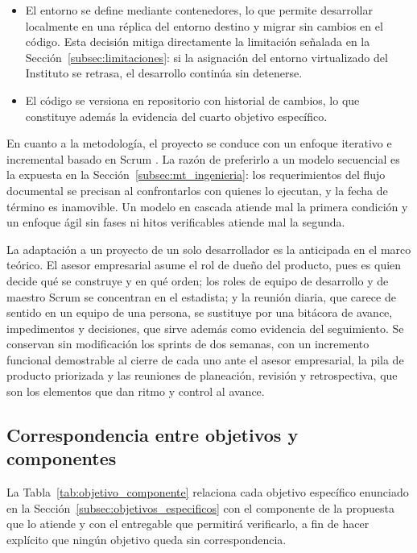 \begin{description}[leftmargin=0pt,font=\bfseries,itemsep=0.6em,parsep=0pt]
  \item[Entorno y despliegue]\leavevmode
  \begin{itemize}[nosep,leftmargin=1.4em,topsep=1pt]
    \item El entorno se define mediante contenedores, lo que permite desarrollar localmente en una réplica del entorno destino y migrar sin cambios en el código. Esta decisión mitiga directamente la limitación señalada en la Sección~\ref{subsec:limitaciones}: si la asignación del entorno virtualizado del Instituto se retrasa, el desarrollo continúa sin detenerse.
    \item El código se versiona en repositorio con historial de cambios, lo que constituye además la evidencia del cuarto objetivo específico.
  \end{itemize}
\end{description}

En cuanto a la metodología, el proyecto se conduce con un enfoque iterativo e incremental basado en Scrum \cite{scrumguide2020}. La razón de preferirlo a un modelo secuencial es la expuesta en la Sección~\ref{subsec:mt_ingenieria}: los requerimientos del flujo documental se precisan al confrontarlos con quienes lo ejecutan, y la fecha de término es inamovible. Un modelo en cascada atiende mal la primera condición y un enfoque ágil sin fases ni hitos verificables atiende mal la segunda.

La adaptación a un proyecto de un solo desarrollador es la anticipada en el marco teórico. El asesor empresarial asume el rol de dueño del producto, pues es quien decide qué se construye y en qué orden; los roles de equipo de desarrollo y de maestro Scrum se concentran en el estadista; y la reunión diaria, que carece de sentido en un equipo de una persona, se sustituye por una bitácora de avance, impedimentos y decisiones, que sirve además como evidencia del seguimiento. Se conservan sin modificación los sprints de dos semanas, con un incremento funcional demostrable al cierre de cada uno ante el asesor empresarial, la pila de producto priorizada y las reuniones de planeación, revisión y retrospectiva, que son los elementos que dan ritmo y control al avance.

\subsection{Correspondencia entre objetivos y componentes}

La Tabla~\ref{tab:objetivo_componente} relaciona cada objetivo específico enunciado en la Sección~\ref{subsec:objetivos_especificos} con el componente de la propuesta que lo atiende y con el entregable que permitirá verificarlo, a fin de hacer explícito que ningún objetivo queda sin correspondencia.

